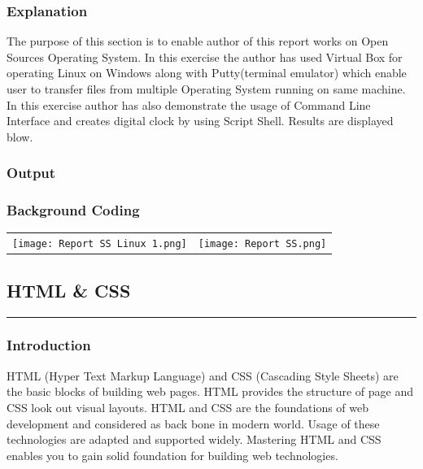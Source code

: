 \documentclass[12pt, A4]{report}
\begin{document}
\subsubsection{Explanation}
The purpose of this section is to enable author of this report works on Open Sources Operating System. In this exercise the author has used Virtual Box for operating Linux on Windows along with Putty(terminal emulator) which enable user to transfer files from multiple Operating System running on same machine. In this exercise author has also demonstrate the usage of Command Line Interface and creates digital clock by using Script Shell. Results are displayed blow.
\subsubsection{Output}
\subsubsection{Background Coding}
\begin{tabular}{cc}
  \texttt{[image: Report SS Linux 1.png]}
  &
  \texttt{[image: Report SS.png]}
   \\                                                     
   
 \end{tabular}

\subsection{HTML & CSS}
\rule{\textwidth}{0.1pt}
\subsubsection{Introduction}
HTML (Hyper Text Markup Language) and CSS (Cascading Style Sheets) are the basic blocks of building web pages. HTML provides the structure of page and CSS look out visual layouts. HTML and CSS are the foundations of web development and considered as back bone in modern world. Usage of these technologies are adapted and supported widely. Mastering HTML and CSS enables you to gain solid foundation for building web technologies.
\end{document}
